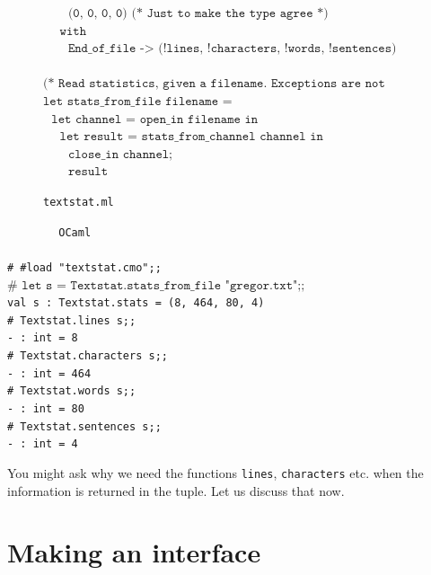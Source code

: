 \documentclass[]{book}
\newcommand{\smspace}{\vspace{4mm}}
\begin{document}
\begin{figure}
\begin{center}
{\begin{minipage}{0.9\textwidth}
$\texttt{~~~~~~(0, 0, 0, 0) (* Just to make the type agree *)}$\\
$\texttt{~~~~with}$\\
$\texttt{~~~~~~End\_of\_file -> (!lines, !characters, !words, !sentences)}$\\
\\
$\texttt{(* Read statistics, given a filename.\ Exceptions are not handled *)}$\\
$\texttt{let stats\_from\_file filename =}$\\
$\texttt{~~let channel = open\_in filename in}$\\
$\texttt{~~~~let result = stats\_from\_channel channel in}$\\
$\texttt{~~~~~~close\_in channel;}$\\
$\texttt{~~~~~~result}$\vphantom{g}
\end{minipage}}
\end{center}
\caption{\small\texttt{textstat.ml}}
\label{textstat2.ml}
\end{figure}


\smspace
\noindent\verb!        OCaml!\\
\noindent\\
\noindent\texttt{\# \#load "textstat.cmo";;}\\
\noindent$\texttt{\#~let~s~=~Textstat.stats_from_file "gregor.txt";;}$\\
\noindent\texttt{val s :\ Textstat.stats = (8, 464, 80, 4)}\\
\noindent\texttt{\# Textstat.lines s;;}\\
\noindent\texttt{- :\ int = 8}\\
\noindent\texttt{\# Textstat.characters s;;}\\
\noindent\texttt{- :\ int = 464}\\
\noindent\texttt{\# Textstat.words s;;}\\
\noindent\texttt{- :\ int = 80}\\
\noindent\texttt{\# Textstat.sentences s;;}\\
\noindent\texttt{- :\ int = 4}\vphantom{g}
\smspace

\noindent You might ask why we need the functions \texttt{lines}, \texttt{characters} etc. when the information is returned in the tuple. Let us discuss that now.

\section*{Making an interface}
\end{document}
